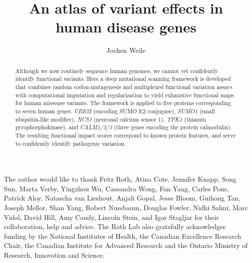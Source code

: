 \documentclass[12pt]{ut-thesis}
\author{Jochen Weile}
\title{An atlas of variant effects in human disease genes}
\newcommand{\gene}[1]{\textit{#1}}
\begin{document}
\begin{preliminary}

\maketitle


\begin{abstract}

Although we now routinely sequence human genomes, we cannot yet confidently identify functional variants. Here a deep mutational scanning framework is developed that combines random codon-mutagenesis and multiplexed functional variation assays with computational imputation and regularization to yield exhaustive functional maps for human missense variants. The framework is applied to five proteins corresponding to seven human genes: \gene{UBE2I} (encoding SUMO E2 conjugase), \gene{SUMO1} (small ubiquitin-like modifier), \gene{NCS1} (neuronal calcium sensor 1), \gene{TPK1} (thiamin pyrophosphokinase), and \gene{CALM1/2/3} (three genes encoding the protein calmodulin). The resulting functional impact scores correspond to known protein features, and serve to confidently identify pathogenic variation. %
\end{abstract}



\begin{acknowledgements}
The author would like to thank Fritz Roth, Atina Cote, Jennifer Knapp, Song Sun, Marta Verby, Yingzhou Wu, Cassandra Wong, Fan Yang, Carles Pons, Patrick Aloy, Natascha van Lieshout, Anjali Gopal, Jesse Bloom, Guihong Tan, Joseph Mellor, Shan Yang, Robert Nussbaum, Douglas Fowler, Nidhi Sahni, Marc Vidal, David Hill, Amy Caudy, Lincoln Stein, and Igor Stagljar for their collaboration, help and advice. The Roth Lab also gratefully acknowledges funding by the National Institutes of Health, the Canadian Excellence Research Chair, the Canadian Institute for Advanced Research and the Ontario Ministry of Research, Innovation and Science. 
\end{acknowledgements}

\tableofcontents




\end{preliminary}
\end{document}
